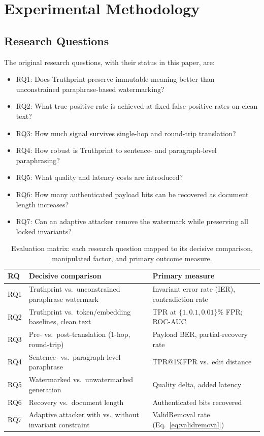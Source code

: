 \documentclass[journal]{IEEEtran}
\begin{document}
\section{Experimental Methodology}
\label{sec:eval}
\subsection{Research Questions}
The original research questions, with their status in this paper, are:
\begin{itemize}[leftmargin=*]
  \item RQ1: Does Truthprint preserve immutable meaning better than unconstrained paraphrase-based watermarking?
  \item RQ2: What true-positive rate is achieved at fixed false-positive rates on clean text?
  \item RQ3: How much signal survives single-hop and round-trip translation?
  \item RQ4: How robust is Truthprint to sentence- and paragraph-level paraphrasing?
  \item RQ5: What quality and latency costs are introduced?
  \item RQ6: How many authenticated payload bits can be recovered as document length increases?
  \item RQ7: Can an adaptive attacker remove the watermark while preserving all locked invariants?
\end{itemize}

\begin{table}[t]
\centering
\caption{Evaluation matrix: each research question mapped to its decisive comparison, manipulated factor, and primary outcome measure.}
\label{tab:matrix}
\renewcommand{\arraystretch}{1.15}
\small
\begin{tabularx}{\linewidth}{@{}l>{\raggedright\arraybackslash}X>{\raggedright\arraybackslash}X@{}}
\toprule
RQ & Decisive comparison & Primary measure \\
\midrule
RQ1 & Truthprint vs.\ unconstrained paraphrase watermark & Invariant error rate (IER), contradiction rate \\
RQ2 & Truthprint vs.\ token/embedding baselines, clean text & TPR at $\{1, 0.1, 0.01\}\%$ FPR; ROC-AUC \\
RQ3 & Pre- vs.\ post-translation (1-hop, round-trip) & Payload BER, partial-recovery rate \\
RQ4 & Sentence- vs.\ paragraph-level paraphrase & TPR@1\%FPR vs.\ edit distance \\
RQ5 & Watermarked vs.\ unwatermarked generation & Quality delta, added latency \\
RQ6 & Recovery vs.\ document length & Authenticated bits recovered \\
RQ7 & Adaptive attacker with vs.\ without invariant constraint & ValidRemoval rate (Eq.~\eqref{eq:validremoval}) \\
\bottomrule
\end{tabularx}
\end{table}
\end{document}
